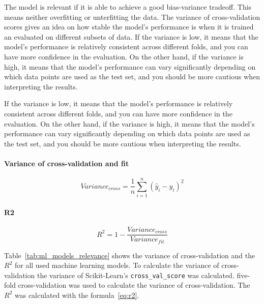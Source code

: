 
The model is relevant if it is able to achieve a good bias-variance tradeoff. This means neither overfitting or unterfitting the data.
The variance of cross-validation scores gives an idea on how stable the model's performance is when it is trained an evaluated on different subsets of data.
If the variance is low, it means that the model's performance is relatively consistent across different folds, and you can have more confidence in the evaluation. On the other hand, if the variance is high, it means that the model's performance can vary significantly depending on which data points are used as the test set, and you should be more cautious when interpreting the results.

If the variance is low, it means that the model's performance is relatively consistent across different folds, and you can have more confidence in the evaluation. On the other hand, if the variance is high, it means that the model's performance can vary significantly depending on which data points are used as the test set, and you should be more cautious when interpreting the results.

\paragraph*{Variance of cross-validation and fit}

\begin{equation}
    \label{eq:variance_cross}
    Variance_{cross} = \frac{1}{n} \sum_{i=1}^{n} (\hat{y}_i - y_i)^2
\end{equation}

\paragraph*{R2}

\begin{equation}
    \label{eq:r2}
    R^2 = 1 - \frac{Variance_{cross}}{Variance_{fit}}
\end{equation}

Table~\ref*{tab:ml_models_relevance} shows the variance of cross-validation and the $R^2$ for all used machine learning models.
To calculate the variance of cross-validation  the variance of Scikit-Learn's \texttt{cross\_val\_score} was calculated. five-fold cross-validation was used to calculate the variance of cross-validation. The $R^2$ was calculated with the formula~\ref{eq:r2}.

